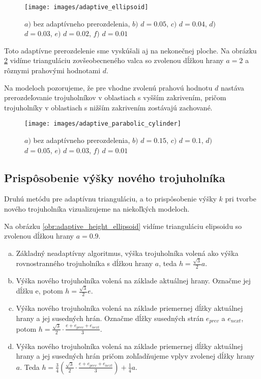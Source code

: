 \begin{figure}
    \centerline{\texttt{[image: images/adaptive\_ellipsoid]}}
    \caption[Adaptívne prerozdelenie elipsoidu.]
    {$a)$ bez adaptívneho prerozdelenia, $b)$ $d=0.05$, $c)$ $d=0.04$, $d)$ $d=0.03$, $e)$ $d=0.02$, $f)$ $d=0.01$}
    \label{obr:adaptive_ellipsoid}
\end{figure}

Toto adaptívne prerozdelenie sme vyskúšali aj na nekonečnej ploche.
Na obrázku \ref{obr:adaptive_parabolic_cylinder} vidíme trianguláciu zovšeobecneného valca 
so zvolenou dĺžkou hrany $a=2$ a rôznymi prahovými hodnotami $d$.

Na modeloch pozorujeme, že pre vhodne zvolenú prahovú hodnotu $d$ nastáva prerozdeľovanie 
trojuholníkov v oblastiach s vyšším zakrivením, pričom trojuholníky v oblastiach s nižším zakrivením 
zostávajú zachované.

\begin{figure}
    \centerline{\texttt{[image: images/adaptive\_parabolic\_cylinder]}}
    \caption[Adaptívne prerozdelenie zovšeobecneného valca.]
    {$a)$ bez adaptívneho prerozdelenia, $b)$ $d=0.15$, $c)$ $d=0.1$, $d)$ $d=0.05$, $e)$ $d=0.03$, $f)$ $d=0.01$}
    \label{obr:adaptive_parabolic_cylinder}
\end{figure}

\subsection{Prispôsobenie výšky nového trojuholníka}
Druhú metódu pre adaptívnu trianguláciu, a to prispôsobenie výšky $k$ pri tvorbe nového trojuholníka 
vizualizujeme na niekoľkých modeloch.

Na obrázku \ref{obr:adaptive_height_ellipsoid} vidíme trianguláciu elipsoidu so zvolenou
dĺžkou hrany $a=0.9$.
\begin{enumerate}[a)]
\item{
    Základný neadaptívny algoritmus, výška trojuholníka volená ako výška rovnostranného trojuholníka
    s dĺžkou hrany $a$, teda $h=\frac{\sqrt{3}}{2} a$.
}
\item{
    Výška nového trojuholníka volená na základe aktuálnej hrany. Označme jej dĺžku e, potom  
    $h=\frac{\sqrt{3}}{2} e$.
}
\item{
    Výška nového trojuholníka volená na základe priemernej dĺžky aktuálnej hrany a jej susedných hrán. 
    Označme dĺžky susedných strán $e_{prev}$ a $e_{next}$, potom  
    $h=\frac{\sqrt{3}}{2} \cdot \frac{e+e_{prev}+e_{next}}{3}$.
}
\item{
    Výška nového trojuholníka volená na základe priemernej dĺžky aktuálnej hrany a jej susedných hrán
    pričom zohľadňujeme vplyv zvolenej dĺžky hrany $a$. Teda
    $h=\frac{3}{4}(\frac{\sqrt{3}}{2} \cdot \frac{e+e_{prev}+e_{next}}{3}) + \frac{1}{4} a$.
}
\end{enumerate}



